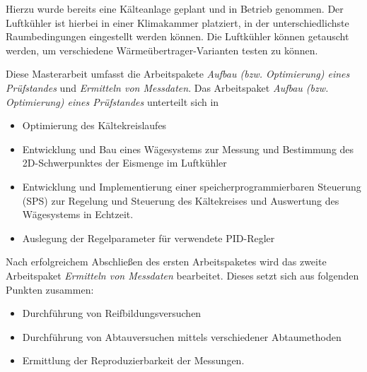Hierzu wurde bereits eine Kälteanlage geplant und in Betrieb genommen. Der Luftkühler ist hierbei in einer Klimakammer platziert, in der unterschiedlichste Raumbedingungen eingestellt werden können. Die Luftkühler können getauscht werden, um verschiedene Wärmeübertrager-Varianten testen zu können.

Diese Masterarbeit umfasst die Arbeitspakete \textit{Aufbau (bzw. Optimierung) eines Prüfstandes} und \textit{Ermitteln von Messdaten}. Das Arbeitspaket \textit{Aufbau (bzw. Optimierung) eines Prüfstandes} unterteilt sich in 

\begin{itemize}

\item Optimierung des Kältekreislaufes

\item Entwicklung und Bau eines Wägesystems zur Messung und Bestimmung des 2D-Schwerpunktes der Eismenge im Luftkühler

\item Entwicklung und Implementierung einer speicherprogrammierbaren Steuerung (SPS) zur Regelung und Steuerung des Kältekreises und Auswertung des Wägesystems in Echtzeit.

\item Auslegung der Regelparameter für verwendete PID-Regler
\end{itemize}

Nach erfolgreichem Abschließen des ersten Arbeitspaketes wird das zweite Arbeitspaket \textit{Ermitteln von Messdaten} bearbeitet. Dieses setzt sich aus folgenden Punkten zusammen:

\begin{itemize}
\item Durchführung von Reifbildungsversuchen
\item Durchführung von Abtauversuchen mittels verschiedener Abtaumethoden
\item Ermittlung der Reproduzierbarkeit der Messungen.
\end{itemize}

